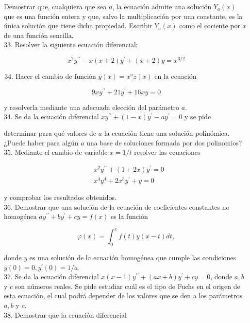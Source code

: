 \documentclass[10pt]{article}
\theoremstyle{plain}
\theoremstyle{definition}
\theoremstyle{remark}
\begin{document}
Demostrar que, cualquiera que sea $a$, la ecuación admite una solución $Y_{a}(x)$ que es una función entera y que, salvo la multiplicación por una constante, es la única solución que tiene dicha propiedad. Escribir $Y_{a}(x)$ como el cociente por $x$ de una función sencilla.\\
33. Resolver la siguiente ecuación diferencial:

$$
x^{2} y^{\prime \prime}-x(x+2) y^{\prime}+(x+2) y=x^{3 / 2}
$$

\begin{enumerate}
  \setcounter{enumi}{33}
  \item Hacer el cambio de función $y(x)=x^{a} z(x)$ en la ecuación
\end{enumerate}

$$
9 x y^{\prime \prime}+21 y^{\prime}+16 x y=0
$$

y resolverla mediante una adecuada elección del parámetro $a$.\\
34. Se da la ecuación diferencial $x y^{\prime \prime}+(1-x) y^{\prime}-a y^{\prime}=0$ y se pide


determinar para qué valores de $a$ la ecuación tiene una solución polinómica. ¿Puede haber para algún $a$ una base de soluciones formada por dos polinomios?\\
35. Mediante el cambio de variable $x=1 / t$ resolver las ecuaciones

$$
\begin{aligned}
& x^{2} y^{\prime \prime}+(1+2 x) y^{\prime}=0 \\
& x^{4} y^{4}+2 x^{3} y^{\prime}+y=0
\end{aligned}
$$

y comprobar los resultados obtenidos.\\
36. Demostrar que una solución de la ecuación de coeficientes constantes no homogénea $a y^{\prime \prime}+b y^{\prime}+c y=f(x)$ es la función

$$
\varphi(x)=\int_{0}^{x} f(t) y(x-t) d t,
$$

donde $y$ es una solución de la ecuación homogénea que cumple las condiciones $y(0)=0, y^{\prime}(0)=1 / a$.\\
37. Se da la ecuación diferencial $x(x-1) y^{\prime \prime}+(a x+b) y^{\prime}+c y=0$, donde $a, b$ y $c$ son números reales. Se pide estudiar cuál es el tipo de Fuchs en el origen de esta ecuación, el cual podrá depender de los valores que se den a los parámetros $a, b$ y $c$.\\
38. Demostrar que la ecuación diferencial
\end{document}
